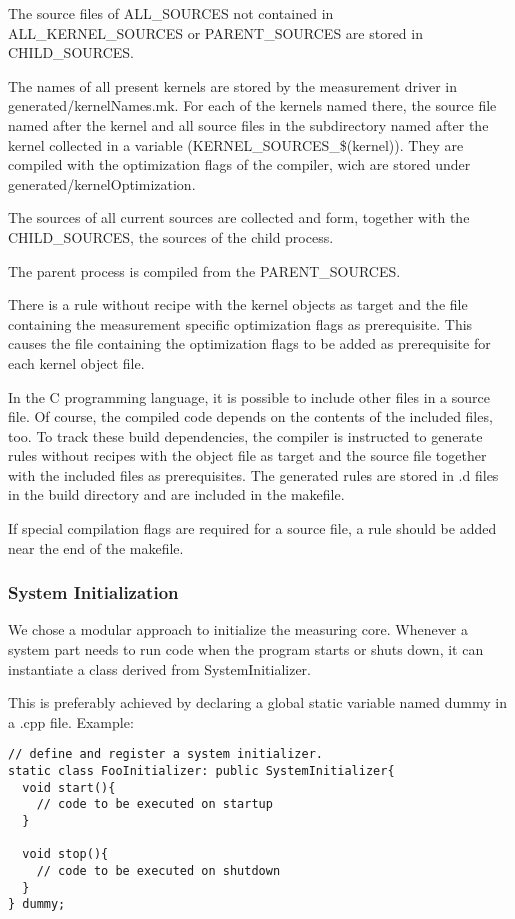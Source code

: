 \documentclass[a4paper,12pt]{article}
\begin{document}
The source files of ALL\_SOURCES not contained in ALL\_KERNEL\_SOURCES or
PARENT\_SOURCES are stored in CHILD\_SOURCES.

The names of all present kernels are stored by the measurement driver in
generated/kernelNames.mk. For each of the kernels named there, the source file
named after the kernel and all source files in the subdirectory named after the
kernel collected in a variable (KERNEL\_SOURCES\_\$(kernel)). They are compiled
with the optimization flags of the compiler, wich are stored under
generated/kernelOptimization.

The sources of all current sources are collected and form, together with the
CHILD\_SOURCES, the sources of the child process.

The parent process is compiled from the PARENT\_SOURCES.

There is a rule without recipe with the kernel objects as target and the file
containing the measurement specific optimization flags as prerequisite. This
causes the file containing the optimization flags to be added as prerequisite
for each kernel object file.

In the C programming language, it is possible to include other files in a source
file. Of course, the compiled code depends on the contents of the included
files, too. To track these build dependencies, the compiler is instructed to
generate rules without recipes with the object file as target and the source
file together with the included files as prerequisites. The generated rules are
stored in .d files in the build directory and are included in the makefile.

If special compilation flags are required for a source file, a rule should be
added near the end of the makefile.

\subsubsection{System Initialization}
We chose a modular approach to initialize the measuring core. Whenever a system
part needs to run code when the program starts or shuts down, it can instantiate
a class derived from SystemInitializer.

This is preferably achieved by declaring a global static variable named dummy
in a .cpp file. Example:
\begin{verbatim}
// define and register a system initializer.
static class FooInitializer: public SystemInitializer{
  void start(){
    // code to be executed on startup
  }

  void stop(){
    // code to be executed on shutdown
  }
} dummy;
\end{verbatim}
\end{document}
